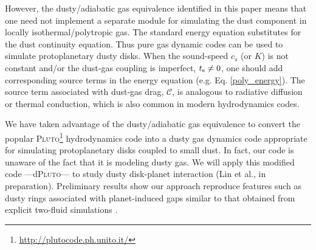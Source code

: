 { However, the dusty/adiabatic gas equivalence identified in this paper
means that one need not implement a separate module for simulating the dust component in
locally isothermal/polytropic gas. The standard energy equation substitutes for the dust continuity 
equation. Thus pure gas dynamic codes can be used to simulate protoplanetary dusty disks. 
} %
When { the sound-speed} $c_s$ (or $K$) is not constant and/or the dust-gas coupling is imperfect, $t_\mathrm{s}\neq0$, one
should add corresponding source terms in the energy equation
(e.g. Eq. \ref{poly_energy}). 
The source term associated with dust-gas drag, $\mathcal{C}$, is 
analogous to radiative diffusion \citep{price15} or thermal 
conduction, which is also common in modern hydrodynamics codes.       

We have taken advantage of the dusty/adiabatic gas equivalence to 
convert the popular
\textsc{Pluto}\footnote{\url{http://plutocode.ph.unito.it/}}      
hydrodynamics code \citep{mignone07} into a dusty gas dynamics code appropriate for
simulating protoplanetary disks coupled to small dust. { In fact,
  our code is unaware of the fact that it is modeling dusty gas.} 
We will apply 
this modified code ---d\textsc{Pluto}--- to study dusty disk-planet interaction (Lin et al., 
in preparation). 
Preliminary results { show our approach} %
reproduce features such as dusty rings associated with 
planet-induced gaps similar to that obtained from explicit two-fluid
simulations \citep[e.g.][]{dong17}. 



